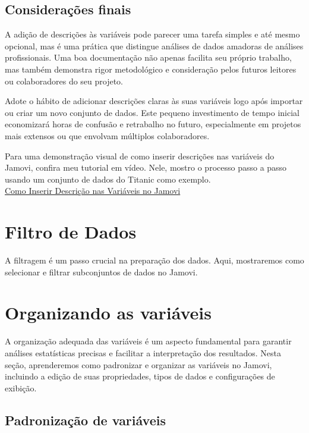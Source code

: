 \subsection{Considerações finais}

A adição de descrições às variáveis pode parecer uma tarefa simples e até mesmo opcional, mas é uma prática que distingue análises de dados amadoras de análises profissionais. Uma boa documentação não apenas facilita seu próprio trabalho, mas também demonstra rigor metodológico e consideração pelos futuros leitores ou colaboradores do seu projeto.

Adote o hábito de adicionar descrições claras às suas variáveis logo após importar ou criar um novo conjunto de dados. Este pequeno investimento de tempo inicial economizará horas de confusão e retrabalho no futuro, especialmente em projetos mais extensos ou que envolvam múltiplos colaboradores.

\begin{tcolorbox}[colback=white,colframe=red,title={\faPlayCircle \ Dica de Conteúdo}]
  Para uma demonstração visual de como inserir descrições nas variáveis do Jamovi, confira meu tutorial em vídeo. Nele, mostro o processo passo a passo usando um conjunto de dados do Titanic como exemplo.\\
  \textcolor{red}{\faYoutube} \href{https://youtu.be/00HUaQaRt_E?si=JdYJKYGYpf6Orlox}{Como Inserir Descrição nas Variáveis no Jamovi}
\end{tcolorbox}


\section{Filtro de Dados}
A filtragem é um passo crucial na preparação dos dados. Aqui, mostraremos como selecionar e filtrar subconjuntos de dados no Jamovi.

\section{Organizando as variáveis}

A organização adequada das variáveis é um aspecto fundamental para garantir análises estatísticas precisas e facilitar a interpretação dos resultados. Nesta seção, aprenderemos como padronizar e organizar as variáveis no Jamovi, incluindo a edição de suas propriedades, tipos de dados e configurações de exibição.

\subsection{Padronização de variáveis}

